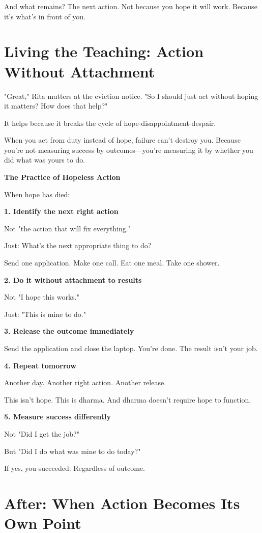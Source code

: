 \documentclass[11pt,twoside]{book}
\begin{document}
And what remains? The next action. Not because you hope it will work. Because it's what's in front of you.

\section*{Living the Teaching: Action Without Attachment}

"Great," Rita mutters at the eviction notice. "So I should just act without hoping it matters? How does that help?"

It helps because it breaks the cycle of hope-disappointment-despair.

When you act from duty instead of hope, failure can't destroy you. Because you're not measuring success by outcomes—you're measuring it by whether you did what was yours to do.

\begin{practicebox}
\textbf{The Practice of Hopeless Action}

When hope has died:

\textbf{1. Identify the next right action}

Not "the action that will fix everything."

Just: What's the next appropriate thing to do?

Send one application. Make one call. Eat one meal. Take one shower.

\textbf{2. Do it without attachment to results}

Not "I hope this works."

Just: "This is mine to do."

\textbf{3. Release the outcome immediately}

Send the application and close the laptop. You're done. The result isn't your job.

\textbf{4. Repeat tomorrow}

Another day. Another right action. Another release.

This isn't hope. This is dharma. And dharma doesn't require hope to function.

\textbf{5. Measure success differently}

Not "Did I get the job?"

But "Did I do what was mine to do today?"

If yes, you succeeded. Regardless of outcome.
\end{practicebox}

\section*{After: When Action Becomes Its Own Point}
\end{document}
